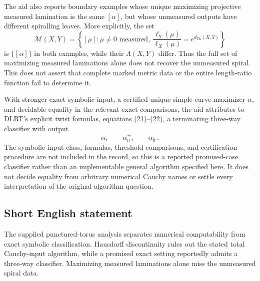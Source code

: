 \documentclass[11pt]{article}
\begin{document}
The aid also reports boundary examples whose unique maximizing projective measured lamination is the same \([\alpha]\), but whose unmeasured outputs have different spiralling leaves. More explicitly, the set
\[
 \mathcal M(X,Y)=\left\{[\mu]:\mu\ne0\text{ measured},\ 
 \frac{\ell_Y(\mu)}{\ell_X(\mu)}=e^{d_{\mathrm{Th}}(X,Y)}\right\}
\]
is \(\{[\alpha]\}\) in both examples, while their \(\Lambda(X,Y)\) differ. Thus the full set of maximizing measured laminations alone does not recover the unmeasured spiral. This does not assert that complete marked metric data or the entire length-ratio function fail to determine it.

With stronger exact symbolic input, a certified unique simple-curve maximizer \(\alpha\), and decidable equality in the relevant exact comparisons, the aid attributes to DLRT's explicit twist formulas, equations (21)--(22), a terminating three-way classifier with output
\[
 \alpha,\qquad\alpha_0^+,\qquad\alpha_0^-.
\]
The symbolic input class, formulas, threshold comparisons, and certification procedure are not included in the record, so this is a reported promised-case classifier rather than an implementable general algorithm specified here. It does not decide equality from arbitrary numerical Cauchy names or settle every interpretation of the original algorithm question.
\subsection{Short English statement}
The supplied punctured-torus analysis separates numerical computability from exact symbolic classification. Hausdorff discontinuity rules out the stated total Cauchy-input algorithm, while a promised exact setting reportedly admits a three-way classifier. Maximizing measured laminations alone miss the unmeasured spiral data.
\end{document}

